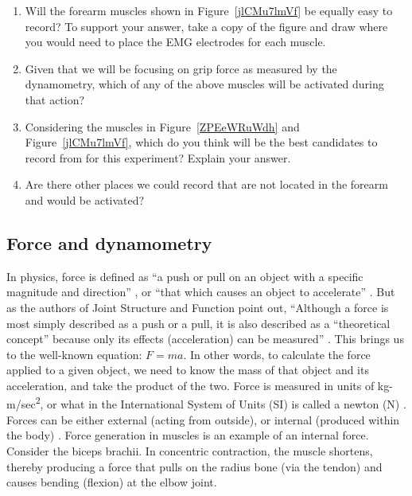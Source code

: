 \documentclass{article}
\begin{document}
\begin{enumerate}
\item Will the forearm muscles shown in Figure~\ref{jlCMu7lmVf} be equally easy to record? To support your answer, take a copy of the figure and draw where you would need to place the EMG electrodes for each muscle.
\item Given that we will be focusing on grip force as measured by the dynamometry, which of any of the above muscles will be activated during that action?
\item Considering the muscles in Figure~\ref{ZPEeWRuWdh} and Figure~\ref{jlCMu7lmVf}, which do you think will be the best candidates to record from for this experiment? Explain your answer.
\item Are there other places we could record that are not located in the forearm and would be activated?
\end{enumerate}

\subsection{Force and dynamometry}

In physics, force is defined as ``a push or pull on an object with a specific magnitude and direction'' \citep{physicsBook}, or ``that which causes an object to accelerate'' \citep{serway2000physics}. But as the authors of Joint Structure and Function point out, ``Although a force is most simply described as a push or a pull, it is also described as a ``theoretical concept'' because only its effects (acceleration) can be measured'' \citep{levangie2011joint}. This brings us to the well-known equation: $F = ma$. In other words, to calculate the force applied to a given object, we need to know the mass of that object and its acceleration, and take the product of the two. Force is measured in units of kg-m/sec\textsuperscript{2}, or what in the International System of Units (SI) is called a newton (N) \citep{serway2000physics}. Forces can be either external (acting from outside), or internal (produced within the body) \citep{levangie2011joint}. Force generation in muscles is an example of an internal force. Consider the biceps brachii. In concentric contraction, the muscle shortens, thereby producing a force that pulls on the radius bone (via the tendon) and causes bending (flexion) at the elbow joint.
\end{document}
